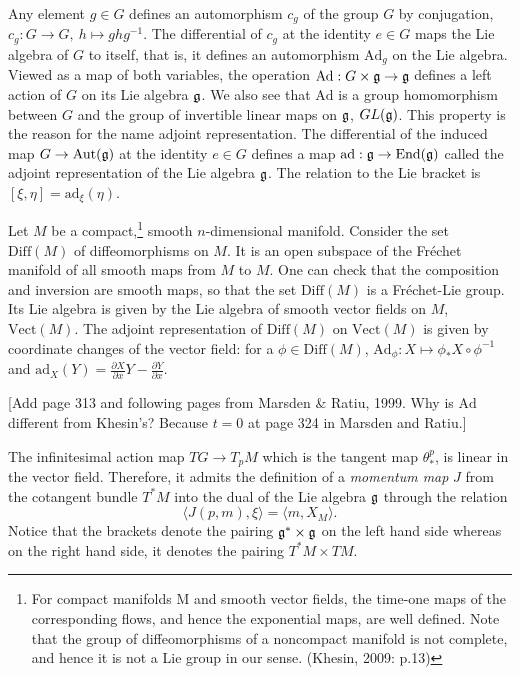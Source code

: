 \documentclass{article}
\theoremstyle{plain}
\theoremstyle{definition}
\newcommand{\Diff}{\ensuremath{\mathrm{Diff}}}
\newcommand{\Vect}{\ensuremath{\mathrm{Vect}}}
\newcommand{\Ad}{\ensuremath{\mathrm{Ad}}}
\newcommand{\ad}{\ensuremath{\mathrm{ad}}}
\newcommand{\mf}{\ensuremath{\mathfrak}}
\begin{document}
Any element $g\in G$ defines an automorphism $c_g$ of the group $G$ by conjugation, $c_g:G\to G,\ h\mapsto ghg^{-1}$. The differential of $c_g$ at the identity $e\in G$ maps the Lie algebra of $G$ to itself, that is, it defines an automorphism $\Ad_g$ on the Lie algebra. Viewed as a map of both variables, the operation $\Ad:G\times \mf g\to \mf g$ defines a left action of $G$ on its Lie algebra $\mf g$. We also see that $\Ad$ is a group homomorphism between $G$ and the group of invertible linear maps on $\mf g$, $GL(\mf g)$. This property is the reason for the name adjoint representation. The differential of the induced map $G\to\mathrm{Aut}(\mf g)$ at the identity $e\in G$ defines a map $\ad : \mf g\to \mathrm{End}(\mf g)$ called the adjoint representation of the Lie algebra $\mf g$. The relation to the Lie bracket is $[\xi,\eta]=\ad_\xi(\eta)$.

Let $M$ be a compact,\footnote{For compact manifolds M and smooth vector fields, the time-one maps of the corresponding flows, and hence the exponential maps, are well defined. Note that the group of diffeomorphisms of a noncompact manifold is not complete, and hence it is not a Lie group in our sense. (Khesin, 2009: p.13)} 
smooth $n$-dimensional manifold. Consider the
set $\Diff(M)$ of diffeomorphisms on $M$. It is an open subspace of the Fréchet
manifold of all smooth maps from $M$ to $M$. One can check that the composition
and inversion are smooth maps, so that the set $\Diff(M)$ is a Fréchet-Lie group. Its Lie algebra is given by the Lie algebra of smooth vector fields on $M$, $\Vect(M)$. The adjoint representation of $\Diff(M)$ on $\Vect(M)$ is given by coordinate changes of the vector field: for a $\phi\in\Diff(M)$, $\Ad_\phi:X\mapsto \phi_*X\circ \phi^{-1}$ and $\ad_X(Y)=\frac{\partial X}{\partial x}Y-\frac{\partial Y}{\partial x}$.



[Add page 313 and following pages from Marsden \& Ratiu, 1999. Why is $\Ad$ different from Khesin's? Because $t=0$ at page 324 in Marsden and Ratiu.]

The infinitesimal action map $TG\to T_pM$ which is the tangent map $\theta^p_*$, is linear in the vector field. Therefore, it admits the definition of a \textit{momentum map} $J$ from the cotangent bundle $T^*M$ into the dual of the Lie algebra $\mf g$ through the relation
\[
\langle J(p,m),\xi\rangle = \langle m,X_M\rangle.
\]
Notice that the brackets denote the pairing $\mf g^*\times\mf g$ on the left hand side whereas on the right hand side, it denotes the pairing $T^*M\times TM$.
\end{document}
